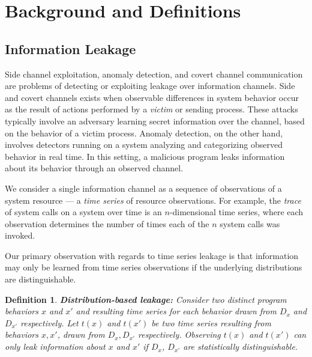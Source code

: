 \documentclass[a4paper]{article}
\newtheorem{definition}{Definition}
\begin{document}
\section{Background and Definitions}
\label{sec:definitions}


\subsection{Information Leakage}
\label{subsec:information_leakage}
Side channel exploitation, anomaly detection, and covert channel communication are problems of detecting or exploiting leakage over information channels.
Side and covert channels exists when observable differences in system behavior occur as the result of actions performed by a \textit{victim} or sending process.
These attacks typically involve an adversary learning secret information over the channel, based on the behavior of a victim process.
Anomaly detection, on the other hand, involves detectors running on a system analyzing and categorizing observed behavior in real time.
In this setting, a malicious program leaks information about its behavior through an observed channel.

We consider a single information channel as a sequence of observations of a system resource --- a \textit{time series} of resource observations.
For example, the \textit{trace} of system calls on a system over time is an $n$-dimensional time series, where each observation determines the number of times each of the $n$ system calls was invoked.

Our primary observation with regards to time series leakage is that information may only be learned from time series observations if the underlying distributions are distinguishable.

\begin{definition}\label{defn:dist_leakage}
    \textbf{Distribution-based leakage:} Consider two distinct program behaviors $x$ and $x'$ and resulting time series for each behavior drawn from $D_x$ and $D_{x'}$ respectively.
    Let $t(x)$ and $t(x')$ be two time series resulting from behaviors $x, x'$, drawn from $D_x, D_{x'}$ respectively.
    Observing $t(x)$ and $t(x')$ can only leak information about $x$ and $x'$ if $D_x$, $D_{x'}$ are statistically distinguishable.
\end{definition}
\end{document}
